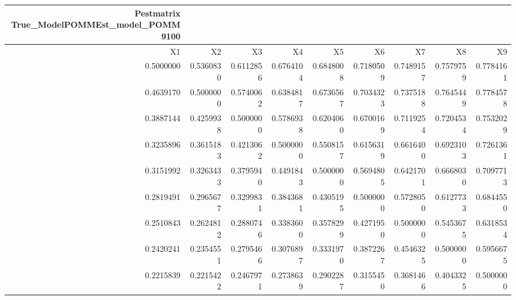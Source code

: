 \begin{longtable}{rrrrrrrrr}
\caption*{
{\large Pestmatrix} \\ 
{\small True\_ModelPOMMEst\_model\_POMM9100}
} \\ 
\toprule
X1 & X2 & X3 & X4 & X5 & X6 & X7 & X8 & X9 \\ 
\midrule
0.5000000 & 0.5360830 & 0.6112856 & 0.6764104 & 0.6848008 & 0.7180509 & 0.7489157 & 0.7579759 & 0.7784161 \\ 
0.4639170 & 0.5000000 & 0.5740062 & 0.6384817 & 0.6736567 & 0.7034323 & 0.7375188 & 0.7645449 & 0.7784578 \\ 
0.3887144 & 0.4259938 & 0.5000000 & 0.5786938 & 0.6204060 & 0.6700169 & 0.7119254 & 0.7204534 & 0.7532029 \\ 
0.3235896 & 0.3615183 & 0.4213062 & 0.5000000 & 0.5508157 & 0.6156319 & 0.6616400 & 0.6923103 & 0.7261361 \\ 
0.3151992 & 0.3263433 & 0.3795940 & 0.4491843 & 0.5000000 & 0.5694805 & 0.6421701 & 0.6668030 & 0.7097713 \\ 
0.2819491 & 0.2965677 & 0.3299831 & 0.3843681 & 0.4305195 & 0.5000000 & 0.5728050 & 0.6127733 & 0.6844550 \\ 
0.2510843 & 0.2624812 & 0.2880746 & 0.3383600 & 0.3578299 & 0.4271950 & 0.5000000 & 0.5453675 & 0.6318534 \\ 
0.2420241 & 0.2354551 & 0.2795466 & 0.3076897 & 0.3331970 & 0.3872267 & 0.4546325 & 0.5000000 & 0.5956675 \\ 
0.2215839 & 0.2215422 & 0.2467971 & 0.2738639 & 0.2902287 & 0.3155450 & 0.3681466 & 0.4043325 & 0.5000000 \\ 
\bottomrule
\end{longtable}

